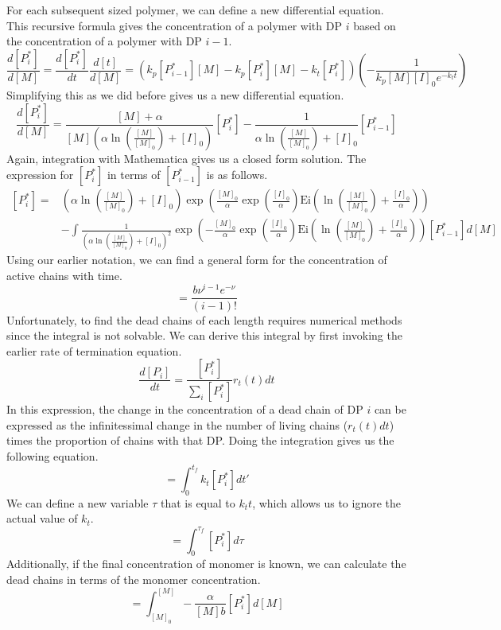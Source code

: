 \documentclass[12pt]{article}
\begin{document}
For each subsequent sized polymer, we can define a new differential equation. This recursive formula gives the concentration of a polymer with DP $i$ based on the concentration of a polymer with DP $i-1$.
\begin{equation}
  \frac{d[P_i^*]}{d[M]} = \frac{d[P_i^*]}{dt}\frac{d[t]}{d[M]}=\left(k_p[P_{i-1}^*][M]-k_p[P_i^*][M]-k_t[P_i^*]\right)\left(-\frac{1}{k_p[M][I]_0e^{-k_tt}}\right)
\end{equation}
Simplifying this as we did before gives us a new differential equation.
\begin{equation}
  \frac{d[P_i^*]}{d[M]} = \frac{[M]+\alpha}{[M]\left(\alpha\ln\left(\frac{[M]}{[M]_0}\right)+[I]_0\right)}[P_i^*]-\frac{1}{\alpha\ln\left(\frac{[M]}{[M]_0}\right)+[I]_0}[P_{i-1}^*]
\end{equation}
Again, integration with Mathematica gives us a closed form solution. The expression for $[P_i^*]$ in terms of $[P_{i-1}^*]$ is as follows.
\begin{equation}
  \begin{split}
    [P_i^*] = & \left(\alpha\ln\left(\frac{[M]}{[M]_0}\right)+[I]_0\right)\exp\left(\frac{[M]_0}{\alpha}\exp\left(\frac{[I]_0}{\alpha}\right)\text{Ei}\left(\ln\left(\frac{[M]}{[M]_0}\right)+\frac{[I]_0}{\alpha}\right)\right)\\
    & -\int \frac{1}{\left(\alpha\ln\left(\frac{[M]}{[M]_0}\right)+[I]_0\right)^2}\exp\left(-\frac{[M]_0}{\alpha}\exp\left(\frac{[I]_0}{\alpha}\right)\text{Ei}\left(\ln\left(\frac{[M]}{[M]_0}\right)+\frac{[I]_0}{\alpha}\right)\right)[P_{i-1}^*]d[M]
  \end{split}
\end{equation}
Using our earlier notation, we can find a general form for the concentration of active chains with time.
\begin{equation}
  [P_i^*]=\frac{b\nu^{i-1}e^{-\nu}}{(i-1)!}
\end{equation}
Unfortunately, to find the dead chains of each length requires numerical methods since the integral is not solvable. We can derive this integral by first invoking the earlier rate of termination equation.
\begin{equation}
  \frac{d[P_i]}{dt}=\frac{[P_i^*]}{\sum_i[P_i^*]}r_t(t)dt
\end{equation}
In this expression, the change in the concentration of a dead chain of DP $i$ can be expressed as the infinitessimal change in the number of living chains ($r_t(t)dt$) times the proportion of chains with that DP. Doing the integration gives us the following equation.
\begin{equation}
  [P_i]=\int_{0}^{t_f}k_t[P_i^*]dt'
\end{equation}
We can define a new variable $\tau$ that is equal to $k_tt$, which allows us to ignore the actual value of $k_t$.
\begin{equation}
  [P_i]=\int_{0}^{\tau_f}[P_i^*]d\tau
\end{equation}
Additionally, if the final concentration of monomer is known, we can calculate the dead chains in terms of the monomer concentration.
\begin{equation}
  [P_i]=\int_{[M]_0}^{[M]}-\frac{\alpha}{[M]b}[P_i^*]d[M]
\end{equation}
\end{document}
